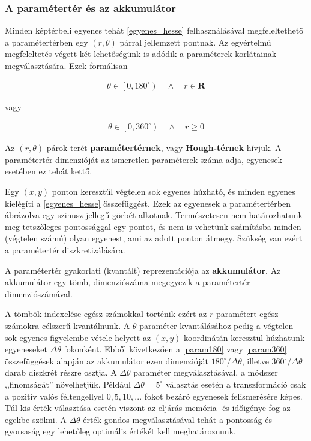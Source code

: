 \subsubsection{A paramétertér és az akkumulátor}\label{sect:parameterter_akkumulator}

Minden képtérbeli egyenes tehát \eqref{egyenes_hesse} felhasználásával megfeleltethető a paramétertérben egy $ (r, \theta) $ párral jellemzett pontnak. Az egyértelmű megfeleltetés végett két lehetőségünk is adódik a paraméterek korlátainak megválasztására. Ezek formálisan

\begin{align}\label{eq:param180}
\theta \in \left[ 0,180^{\circ} \right) \quad \wedge \quad r \in \mathbf{R}
\end{align}

vagy

\begin{align}\label{eq:param360}
\theta \in \left[ 0,360^{\circ} \right) \quad \wedge \quad r \geq 0
\end{align}

Az $ (r, \theta) $ párok terét \textbf{paramétertérnek}, vagy \textbf{Hough-térnek} hívjuk. A paramétertér dimenzióját az ismeretlen paraméterek száma adja, egyenesek esetében ez tehát kettő.

Egy $ (x,y) $ ponton keresztül végtelen sok egyenes húzható, és minden egyenes kielégíti a \eqref{egyenes_hesse} összefüggést. Ezek az egyenesek a paramétertérben ábrázolva egy szinusz-jellegű görbét alkotnak. Természetesen nem határozhatunk meg tetszőleges pontossággal egy pontot, és nem is vehetünk számításba minden (végtelen számú) olyan egyenest, ami az adott ponton átmegy. Szükség van ezért a paramétertér diszkretizálására.

\bigskip

A paramétertér gyakorlati (kvantált) reprezentációja az \textbf{akkumulátor}. Az akkumulátor egy tömb, dimenziószáma megegyezik a paramétertér dimenziószámával.

A tömbök indexelése egész számokkal történik ezért az $ r $ paramétert egész számokra célszerű kvantálnunk. A $ \theta $ paraméter kvantálásához pedig a végtelen sok egyenes figyelembe vétele helyett az $ (x,y) $ koordinátán keresztül húzhatunk egyeneseket $ \varDelta \theta $ fokonként. Ebből következően a \eqref{param180} vagy \eqref{param360} összefüggések alapján az akkumulátor ezen dimenzióját $ 180^{\circ} / \varDelta \theta $, illetve $ 360^{\circ} / \varDelta \theta $ darab diszkrét részre osztja. A $ \varDelta \theta $ paraméter megválasztásával, a módszer ,,finomságát'' növelhetjük. Például $ \varDelta \theta = 5^{\circ} $ választás esetén a transzformáció csak a pozitív valós féltengellyel $ 0, 5, 10, ... $ fokot bezáró egyenesek felismerésére képes. Túl kis érték választása esetén viszont az eljárás memória- és időigénye fog az egekbe szökni. A $ \varDelta \theta $ érték gondos megválasztásával tehát a pontosság és gyorsaság egy lehetőleg optimális értékét kell meghatároznunk.

